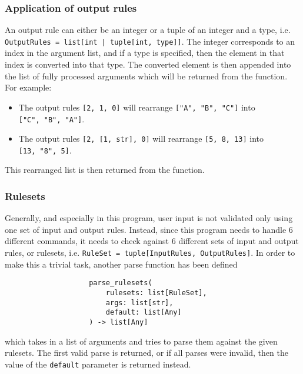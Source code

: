 \documentclass{article}
\begin{document}
			\subsubsection{Application of output rules}
				An output rule can either be an integer or a tuple of an integer and a type, i.e.
				\verb+OutputRules = list[int | tuple[int, type]]+. The integer
				corresponds to an index in the argument list, and if a type is specified, then the element
				in that index is converted into that type. The converted element is then appended into the
				list of fully processed arguments which will be returned from the function. For example:

				\begin{itemize}
					\item The output rules \verb|[2, 1, 0]| will rearrange \verb|["A", "B", "C"]| into \\
					\verb|["C", "B", "A"]|.
					\item The output rules \verb|[2, [1, str], 0]| will rearrange \verb|[5, 8, 13]| into \\
					\verb|[13, "8", 5]|.
				\end{itemize}

				This rearranged list is then returned from the function.

			\subsubsection{Rulesets}
				Generally, and especially in this program, user input is not validated only using one set of
				input and output rules. Instead, since this program needs to handle 6 different commands,
				it needs to check against 6 different sets of input and output rules, or rulesets, i.e.
				\verb|RuleSet = tuple[InputRules, OutputRules]|. In order to make this a trivial task, another
				parse function has been defined

				\begin{verbatim}
					parse_rulesets(
						rulesets: list[RuleSet],
						args: list[str],
						default: list[Any]
					) -> list[Any]
				\end{verbatim}

				which takes in a list of arguments and tries to parse them against the given rulesets. The first
				valid parse is returned, or if all parses were invalid, then the value of the \verb|default|
				parameter is returned instead.
\end{document}
